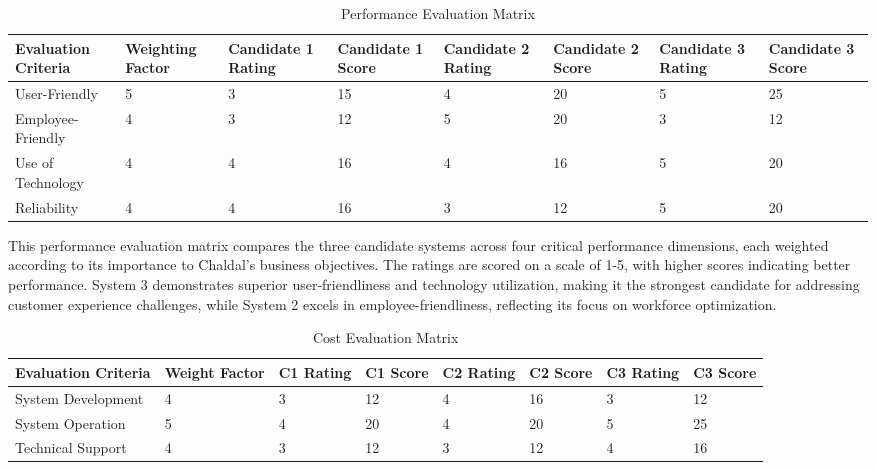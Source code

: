 \documentclass[12pt,a4paper]{article}
\begin{document}
\begin{table}[h]
\centering
\caption{Performance Evaluation Matrix}
\begin{tabular}{|p{3cm}|p{1.5cm}|p{1.5cm}|p{1.5cm}|p{1.5cm}|p{1.5cm}|p{1.5cm}|p{1.5cm}|}
\hline
Evaluation Criteria & Weighting Factor & Candidate 1 Rating & Candidate 1 Score & Candidate 2 Rating & Candidate 2 Score & Candidate 3 Rating & Candidate 3 Score \\ \hline

User-Friendly & 5 & 3 & 15 & 4 & 20 & 5 & 25 \\ \hline

Employee-Friendly & 4 & 3 & 12 & 5 & 20 & 3 & 12 \\ \hline

Use of Technology & 4 & 4 & 16 & 4 & 16 & 5 & 20 \\ \hline

Reliability & 4 & 4 & 16 & 3 & 12 & 5 & 20 \\ \hline
\end{tabular}
\end{table}

This performance evaluation matrix compares the three candidate systems across four critical performance dimensions, each weighted according to its importance to Chaldal's business objectives. The ratings are scored on a scale of 1-5, with higher scores indicating better performance. System 3 demonstrates superior user-friendliness and technology utilization, making it the strongest candidate for addressing customer experience challenges, while System 2 excels in employee-friendliness, reflecting its focus on workforce optimization.



\begin{table}[h]
\centering
\caption{Cost Evaluation Matrix}
\begin{tabular}{|p{4.5cm}|p{1.2cm}|p{1.2cm}|p{1.2cm}|p{1.2cm}|p{1.2cm}|p{1.2cm}|p{1.2cm}|}
\hline
Evaluation Criteria & Weight Factor & C1 Rating & C1 Score & C2 Rating & C2 Score & C3 Rating & C3 Score \\ \hline

System Development & 4 & 3 & 12 & 4 & 16 & 3 & 12 \\ \hline

System Operation & 5 & 4 & 20 & 4 & 20 & 5 & 25 \\ \hline

Technical Support & 4 & 3 & 12 & 3 & 12 & 4 & 16 \\ \hline
\end{tabular}
\end{table}
\end{document}
